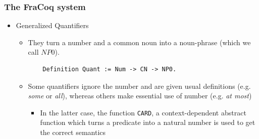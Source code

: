 \documentclass[11pt]{beamer}
\begin{document}
\begin{frame}[fragile]
	\frametitle{The FraCoq system}
	
	\begin{itemize}
		
		\item Generalized Quantifiers
		
		\begin{itemize}
			
			\item They turn a number
			and a common noun into a noun-phrase (which we call $NP0$).
			
			
\begin{verbatim}
	Definition Quant := Num -> CN -> NP0.
\end{verbatim}	

\item Some quantifiers ignore the number and are given usual definitions (e.g. \textit{some} or \textit{all}), whereas others make essential use of number (e.g. \textit{at most})	
			

\begin{itemize}
	

\item In the latter case, the function \texttt{CARD}, a context-dependent
abstract function which turns a predicate into a natural number	is used to get the correct semantics 	
\end{itemize}\end{itemize}\end{itemize}
\end{frame}	
\end{document}
